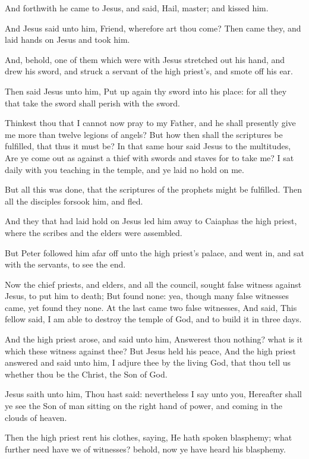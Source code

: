 \Verse And forthwith he came to Jesus, and said, Hail, master; and kissed him.

\Verse And Jesus said unto him, Friend, wherefore art thou come? Then came they, and laid hands on Jesus and took him.

\Verse And, behold, one of them which were with Jesus stretched out his hand, and drew his sword, and struck a servant of the high priest's, and smote off his ear.

\Verse Then said Jesus unto him, Put up again thy sword into his place: for all they that take the sword shall perish with the sword.

\Verse Thinkest thou that I cannot now pray to my Father, and he shall presently give me more than twelve legions of angels?  \Verse But how then shall the scriptures be fulfilled, that thus it must be?  \Verse In that same hour said Jesus to the multitudes, Are ye come out as against a thief with swords and staves for to take me? I sat daily with you teaching in the temple, and ye laid no hold on me.

\Verse But all this was done, that the scriptures of the prophets might be fulfilled. Then all the disciples forsook him, and fled.

\Verse And they that had laid hold on Jesus led him away to Caiaphas the high priest, where the scribes and the elders were assembled.

\Verse But Peter followed him afar off unto the high priest's palace, and went in, and sat with the servants, to see the end.

\Verse Now the chief priests, and elders, and all the council, sought false witness against Jesus, to put him to death; \Verse But found none: yea, though many false witnesses came, yet found they none. At the last came two false witnesses, \Verse And said, This fellow said, I am able to destroy the temple of God, and to build it in three days.

\Verse And the high priest arose, and said unto him, Answerest thou nothing? what is it which these witness against thee?  \Verse But Jesus held his peace, And the high priest answered and said unto him, I adjure thee by the living God, that thou tell us whether thou be the Christ, the Son of God.

\Verse Jesus saith unto him, Thou hast said: nevertheless I say unto you, Hereafter shall ye see the Son of man sitting on the right hand of power, and coming in the clouds of heaven.

\Verse Then the high priest rent his clothes, saying, He hath spoken blasphemy; what further need have we of witnesses? behold, now ye have heard his blasphemy.

